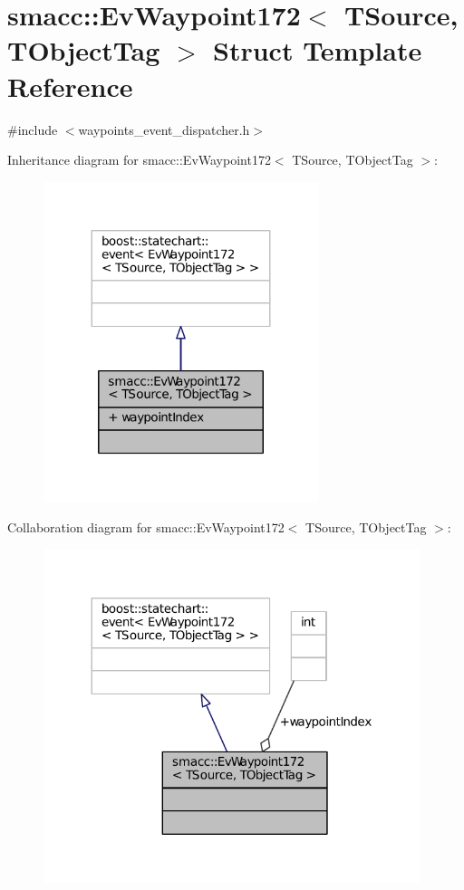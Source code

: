 \hypertarget{structsmacc_1_1EvWaypoint172}{}\section{smacc\+:\+:Ev\+Waypoint172$<$ T\+Source, T\+Object\+Tag $>$ Struct Template Reference}
\label{structsmacc_1_1EvWaypoint172}


{\ttfamily \#include $<$waypoints\+\_\+event\+\_\+dispatcher.\+h$>$}



Inheritance diagram for smacc\+:\+:Ev\+Waypoint172$<$ T\+Source, T\+Object\+Tag $>$\+:
\nopagebreak
\begin{figure}[H]
\begin{center}
\leavevmode
\includegraphics[width=227pt]{structsmacc_1_1EvWaypoint172__inherit__graph}
\end{center}
\end{figure}


Collaboration diagram for smacc\+:\+:Ev\+Waypoint172$<$ T\+Source, T\+Object\+Tag $>$\+:
\nopagebreak
\begin{figure}[H]
\begin{center}
\leavevmode
\includegraphics[width=312pt]{structsmacc_1_1EvWaypoint172__coll__graph}
\end{center}
\end{figure}
